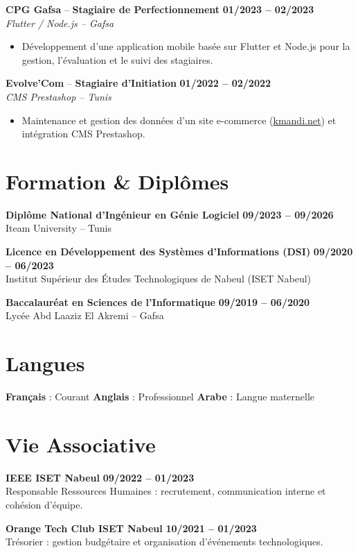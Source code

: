 \documentclass[10pt,a4paper]{article}
\newcommand{\cvitem}[2]{
  \textbf{#1} \hfill {\color{textgray}\textbf{#2}}
}
\newcommand{\role}[4]{
  \vspace{3pt}
  \textbf{\color{primarydark}#1} -- \textbf{#2} \hfill {\color{textgray}\textbf{#3}}\\
  {\color{subgray}\textit{#4}}\vspace{1pt}
}
\begin{document}
\role{CPG Gafsa}{Stagiaire de Perfectionnement}{01/2023 -- 02/2023}{Flutter / Node.js -- Gafsa}
\begin{itemize}
  \item Développement d'une application mobile basée sur Flutter et Node.js pour la gestion, l'évaluation et le suivi des stagiaires.
\end{itemize}

\role{Evolve'Com}{Stagiaire d'Initiation}{01/2022 -- 02/2022}{CMS Prestashop -- Tunis}
\begin{itemize}
  \item Maintenance et gestion des données d'un site e-commerce (\href{https://kmandi.net}{kmandi.net}) et intégration CMS Prestashop.
\end{itemize}

\vspace{3pt}
\section{Formation \& Diplômes}
\cvitem{Diplôme National d'Ingénieur en Génie Logiciel}{09/2023 -- 09/2026}\\
{\color{textgray}Iteam University -- Tunis}

\vspace{2pt}
\cvitem{Licence en Développement des Systèmes d'Informations (DSI)}{09/2020 -- 06/2023}\\
{\color{textgray}Institut Supérieur des Études Technologiques de Nabeul (ISET Nabeul)}

\vspace{2pt}
\cvitem{Baccalauréat en Sciences de l'Informatique}{09/2019 -- 06/2020}\\
{\color{textgray}Lycée Abd Laaziz El Akremi -- Gafsa}

\vspace{3pt}
\section{Langues}
\textbf{Français} : Courant \quad\textbar\quad \textbf{Anglais} : Professionnel \quad\textbar\quad \textbf{Arabe} : Langue maternelle

\vspace{3pt}
\section{Vie Associative}
\cvitem{IEEE ISET Nabeul}{09/2022 -- 01/2023}\\
{\color{textgray}Responsable Ressources Humaines : recrutement, communication interne et cohésion d'équipe.}

\vspace{2pt}
\cvitem{Orange Tech Club ISET Nabeul}{10/2021 -- 01/2023}\\
{\color{textgray}Trésorier : gestion budgétaire et organisation d'événements technologiques.}
\end{document}
